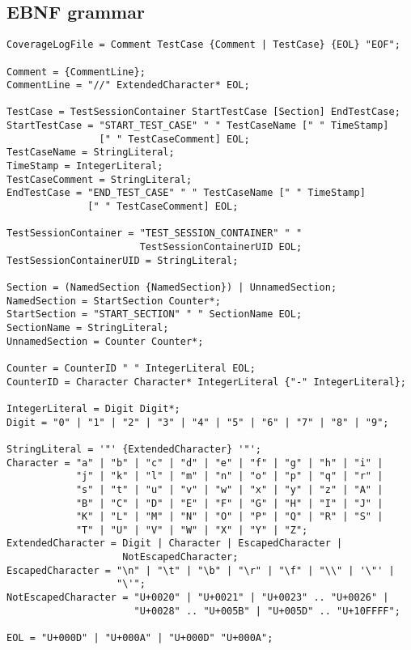 \subsection{EBNF grammar}
\begin{verbatim}
CoverageLogFile = Comment TestCase {Comment | TestCase} {EOL} "EOF";

Comment = {CommentLine};
CommentLine = "//" ExtendedCharacter* EOL;

TestCase = TestSessionContainer StartTestCase [Section] EndTestCase;
StartTestCase = "START_TEST_CASE" " " TestCaseName [" " TimeStamp]
                [" " TestCaseComment] EOL;
TestCaseName = StringLiteral;
TimeStamp = IntegerLiteral;
TestCaseComment = StringLiteral;
EndTestCase = "END_TEST_CASE" " " TestCaseName [" " TimeStamp]
              [" " TestCaseComment] EOL;

TestSessionContainer = "TEST_SESSION_CONTAINER" " "
                       TestSessionContainerUID EOL;
TestSessionContainerUID = StringLiteral;

Section = (NamedSection {NamedSection}) | UnnamedSection;
NamedSection = StartSection Counter*;
StartSection = "START_SECTION" " " SectionName EOL;
SectionName = StringLiteral;
UnnamedSection = Counter Counter*;

Counter = CounterID " " IntegerLiteral EOL;
CounterID = Character Character* IntegerLiteral {"-" IntegerLiteral};

IntegerLiteral = Digit Digit*;
Digit = "0" | "1" | "2" | "3" | "4" | "5" | "6" | "7" | "8" | "9";

StringLiteral = '"' {ExtendedCharacter} '"';
Character = "a" | "b" | "c" | "d" | "e" | "f" | "g" | "h" | "i" |
            "j" | "k" | "l" | "m" | "n" | "o" | "p" | "q" | "r" |
            "s" | "t" | "u" | "v" | "w" | "x" | "y" | "z" | "A" |
            "B" | "C" | "D" | "E" | "F" | "G" | "H" | "I" | "J" |
            "K" | "L" | "M" | "N" | "O" | "P" | "Q" | "R" | "S" |
            "T" | "U" | "V" | "W" | "X" | "Y" | "Z";
ExtendedCharacter = Digit | Character | EscapedCharacter |
                    NotEscapedCharacter;
EscapedCharacter = "\n" | "\t" | "\b" | "\r" | "\f" | "\\" | '\"' |
                   "\'";
NotEscapedCharacter = "U+0020" | "U+0021" | "U+0023" .. "U+0026" |
                      "U+0028" .. "U+005B" | "U+005D" .. "U+10FFFF";

EOL = "U+000D" | "U+000A" | "U+000D" "U+000A";
\end{verbatim}

\newpage

